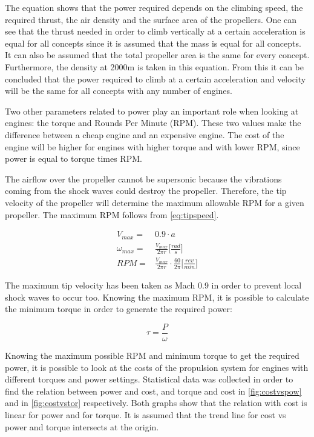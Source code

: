 The equation shows that the power required depends on the climbing speed, the required thrust, the air density and the surface area of the propellers.  One can see that the thrust needed in order to climb vertically at a certain acceleration is equal for all concepts since it is assumed that the mass is equal for all concepts. It can also be assumed that the total propeller area is the same for every concept. Furthermore, the density at 2000m is taken in this equation. From this it can be concluded that the power required to climb at a certain acceleration and velocity will be the same for all concepts with any number of engines.

Two other parameters related to power play an important role when looking at engines: the torque and Rounds Per Minute (RPM). These two values make the difference between a cheap engine and an expensive engine. The cost of the engine will be higher for engines with higher torque and with lower RPM, since power is equal to torque times RPM.  

The airflow  over the propeller cannot be supersonic because the vibrations coming from the shock waves could destroy the propeller. Therefore, the tip velocity of the propeller will determine the maximum allowable RPM for a given propeller. The maximum RPM follows from \autoref{eq:tipspeed}.

\begin{equation}\label{eq:tipspeed}
\begin{aligned}
    V_{max} =& 0.9 \cdot a \\
    \omega_{max} =& \frac{V_{max}}{2 \pi r} \Big[\frac{rad}{s}\Big] \\
    RPM =& \frac{V_{max}}{2 \pi r} \cdot \frac{60}{2 \pi} \Big[\frac{rev}{min} \Big]
\end{aligned}
\end{equation}

The maximum tip velocity has been taken as Mach 0.9 in order to prevent local shock waves to occur too. Knowing the maximum RPM, it is possible to calculate the minimum torque in order to generate the required power:

\begin{equation}\label{eq:powtor}
    \tau = \frac{P}{\omega}
\end{equation}

Knowing the maximum possible RPM and minimum torque to get the required power, it is possible to look at the costs of the propulsion system for engines with different torques and power settings. Statistical data was collected in order to find the relation between power and cost, and torque and cost in \autoref{fig:costvspow} and in \autoref{fig:costvstor} respectively. Both graphs show that the relation with cost is linear for power and for torque. It is assumed that the trend line for cost vs power and torque intersects at the origin.

